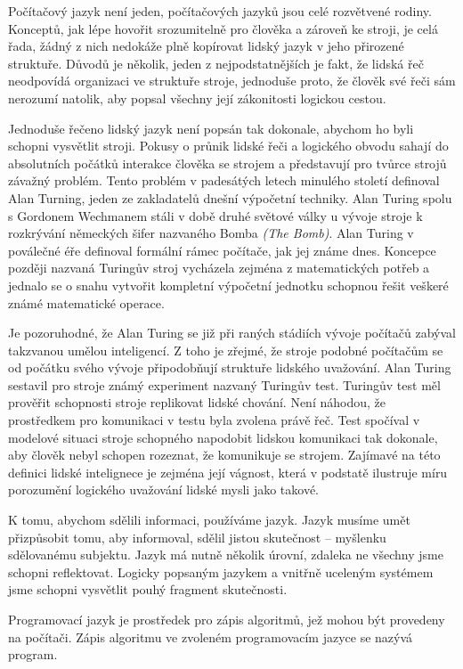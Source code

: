 \documentclass[10pt]{book}
\begin{document}
Počítačový jazyk není jeden, počítačových jazyků jsou celé rozvětvené rodiny. Konceptů, jak lépe hovořit srozumitelně pro člověka a zároveň ke stroji, je celá řada, žádný z nich nedokáže plně kopírovat lidský jazyk v jeho přirozené struktuře. Důvodů je několik, jeden z nejpodstatnějších je fakt, že lidská řeč neodpovídá organizaci ve struktuře stroje, jednoduše proto, že člověk své řeči sám nerozumí natolik, aby popsal všechny její zákonitosti logickou cestou.

Jednoduše řečeno lidský jazyk není popsán tak dokonale, abychom ho byli schopni vysvětlit stroji. Pokusy o průnik lidské řeči a logického obvodu sahají do absolutních počátků interakce člověka se strojem a představují pro tvůrce strojů závažný problém. Tento problém v padesátých letech minulého století definoval Alan Turning, jeden ze zakladatelů dnešní výpočetní techniky. Alan Turing spolu s Gordonem Wechmanem stáli v době druhé světové války u vývoje stroje k rozkrývání německých šifer nazvaného Bomba {\em (The Bomb)}. Alan Turing v poválečné éře definoval formální rámec počítače, jak jej známe dnes. Koncepce později nazvaná Turingův stroj vycházela zejména z matematických potřeb a jednalo se o snahu vytvořit kompletní výpočetní jednotku schopnou řešit veškeré známé matematické operace. 


Je pozoruhodné, že Alan Turing se již při raných stádiích vývoje počítačů zabýval takzvanou umělou inteligencí. Z toho je zřejmé, že stroje podobné počítačům se od počátku svého vývoje připodobňují struktuře lidského uvažování. Alan Turing sestavil pro stroje známý experiment nazvaný Turingův test. Turingův test měl prověřit schopnosti stroje replikovat lidské chování. Není náhodou, že prostředkem pro komunikaci v testu byla zvolena právě řeč. Test spočíval v modelové situaci stroje schopného napodobit lidskou komunikaci tak dokonale, aby člověk nebyl schopen rozeznat, že komunikuje se strojem. Zajímavé na této definici lidské intelignece je zejména její vágnost, která v podstatě ilustruje míru porozumění logického uvažování lidské mysli jako takové.

K tomu, abychom sdělili informaci, používáme jazyk. Jazyk musíme umět přizpůsobit tomu, aby informoval, sdělil jistou skutečnost -- myšlenku sdělovanému subjektu. Jazyk má nutně několik úrovní, zdaleka ne všechny jsme schopni reflektovat. Logicky popsaným jazykem a vnitřně uceleným systémem jsme schopni vysvětlit pouhý fragment skutečnosti.

Programovací jazyk je prostředek pro zápis algoritmů, jež mohou být provedeny na počítači. Zápis algoritmu ve zvoleném programovacím jazyce se nazývá program.
\end{document}

